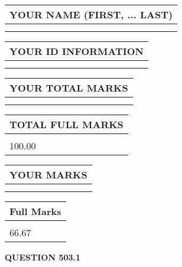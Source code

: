 \documentclass{ctexart}
\begin{document}
   
   
   
\newpage 
\setcounter{page}{ 
   503001 } 
   
   
   
   
\noindent\begin{tabular}{|l|}
\hline
YOUR NAME (FIRST, ... LAST)  \\
\hline
 \\ 
 \\ 
\hline
\end{tabular}
\hspace{0.05in} \begin{tabular}{|l|}
\hline
 YOUR   ID   INFORMATION  \\
\hline
 \\ 
 \\ 
\hline
\end{tabular}
   
   
\vspace{0.2in}\noindent\begin{tabular}{|l|}
\hline
YOUR TOTAL MARKS  \\
\hline
 \\ 
 \\ 
\hline
\end{tabular}
\hspace{0.05in} \begin{tabular}{|l|}
\hline
TOTAL FULL MARKS  \\
\hline
 \\ 
100.00 \\
\hline
\end{tabular}
   
   
 \vspace{0.2in}
 
 
 
 
   
   
  
\vspace{0.2in}
  
\noindent\begin{tabular}{|l|}
\hline
 YOUR MARKS  \\
\hline
 \\ 
 \\ 
\hline
\end{tabular}
\hspace{0.05in} \begin{tabular}{|l|}
\hline
 Full Marks  \\
\hline
 \\ 
66.67 \\
\hline
\end{tabular}
{\textbf{\Large{QUESTION
503.1 
}}}
  
\end{document}
